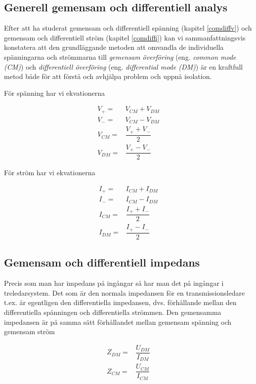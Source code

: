 \subsection{Generell gemensam och differentiell analys}
\label{comdiffgeneric}

Efter att ha studerat gemensam och differentiell spänning (kapitel
\ref{comdiffv}) och gemensam och differentiell ström (kapitel \ref{comdiffi})
kan vi sammanfattningsvis konstatera att den grundläggande metoden att omvandla
de individuella spänningarna och strömmarna till \emph{gemensam överföring}
(eng. \emph{common mode (CM)}) och \emph{differentiell överföring}
(eng. \emph{differential mode (DM)}) är en kraftfull metod både för att
förstå och avhjälpa problem och uppnå isolation.

För spänning har vi ekvationerna

\begin{eqnarray}
V_+ = & V_{CM} + V_{DM}\\
V_- = & V_{CM} - V_{DM}\\
V_{CM} = & \dfrac{V_+ + V_-}{2}\\
V_{DM} = & \dfrac{V_+ - V_-}{2}
\end{eqnarray}

För ström har vi ekvationerna

\begin{eqnarray}
I_+ = & I_{CM} + I_{DM}\\
I_- = & I_{CM} - I_{DM}\\
I_{CM} = & \dfrac{I_+ + I_-}{2}\\
I_{DM} = & \dfrac{I_+ - I_-}{2}
\end{eqnarray}

\subsection{Gemensam och differentiell impedans}

Precis som man har impedans på ingångar så har man det på ingångar i
treledarsystem.
Det som är den normala impedansen för en transmissionsledare t.ex. är
egentligen den differentiella impedansen, dvs. förhållande mellan den
differentiella spänningen och differentiella strömmen.
Den gemensamma impedansen är på samma sätt förhållandet mellan gemensam
spänning och gemensam ström

\begin{eqnarray}
Z_{DM} = & \dfrac{U_{DM}}{I_{DM}}\\
Z_{CM} = & \dfrac{U_{CM}}{I_{CM}}
\end{eqnarray}

